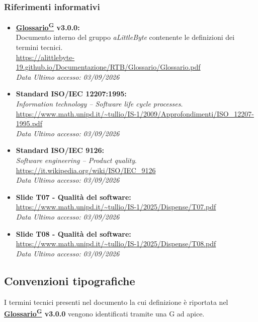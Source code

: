 ﻿\documentclass[a4paper,12pt]{article}
\providecommand{\glslink}[2]{\href{https://alittlebyte-19.github.io/Documentazione/glossario.html\#gls-#1}{\underline{#2}\textsuperscript{\scriptsize G}}}
\begin{document}
\subsubsection{Riferimenti informativi}
\begin{itemize}
    \item \textbf{\glslink{glossario}{Glossario} v3.0.0:}\\
    Documento interno del gruppo \textit{aLittleByte} contenente le definizioni dei termini tecnici.\\
    \url{https://alittlebyte-19.github.io/Documentazione/RTB/Glossario/Glossario.pdf}\\
    \textit{Data Ultimo accesso: 03/09/2026}

    \item \textbf{Standard ISO/IEC 12207:1995:}\\
    \textit{Information technology -- Software life cycle processes}.\\
    \url{https://www.math.unipd.it/~tullio/IS-1/2009/Approfondimenti/ISO_12207-1995.pdf}\\
    \textit{Data Ultimo accesso: 03/09/2026}

    \item \textbf{Standard ISO/IEC 9126:}\\
    \textit{Software engineering -- Product quality}.\\
    \url{https://it.wikipedia.org/wiki/ISO/IEC_9126}\\
    \textit{Data Ultimo accesso: 03/09/2026}

    \item \textbf{Slide T07 - Qualità del software:}\\
    \url{https://www.math.unipd.it/~tullio/IS-1/2025/Dispense/T07.pdf}\\
    \textit{Data Ultimo accesso: 03/09/2026}

    \item \textbf{Slide T08 - Qualità del software:}\\
    \url{https://www.math.unipd.it/~tullio/IS-1/2025/Dispense/T08.pdf}\\
    \textit{Data Ultimo accesso: 03/09/2026}
\end{itemize}

\subsection{Convenzioni tipografiche}
I termini tecnici presenti nel documento la cui definizione è riportata nel \textbf{\glslink{glossario}{Glossario} v3.0.0} vengono identificati tramite una G ad apice.
\end{document}
